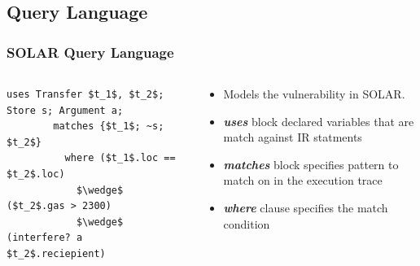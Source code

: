 \documentclass{beamer}
\begin{document}
\subsection{Query Language}

\begin{frame}[fragile]
  \frametitle{SOLAR Query Language}
  \begin{columns}[T]
    \begin{column}{0.5\textwidth}
      \begin{lstlisting}[language=Solar, numbers=none]
        uses Transfer $t_1$, $t_2$; Store s; Argument a;
        matches {$t_1$; ~s; $t_2$}
          where ($t_1$.loc == $t_2$.loc)
            $\wedge$ ($t_2$.gas > 2300)
            $\wedge$ (interfere? a $t_2$.reciepient)
      \end{lstlisting}
    \end{column}
    \begin{column}{0.5\textwidth}
      \begin{itemize}
      \item Models the vulnerability in SOLAR.
      \item \textit{\textbf{uses}} block declared variables
        that are match against IR statments
      \item \textit{\textbf{matches}} block specifies pattern
        to match on in the execution trace
      \item \textit{\textbf{where}} clause specifies the match
        condition
      \end{itemize}
    \end{column}
  \end{columns}
\end{frame}
\end{document}
